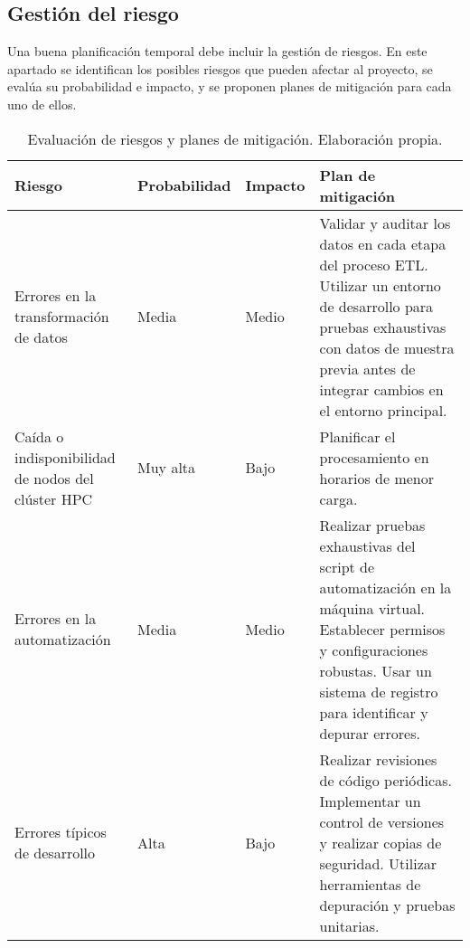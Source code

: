 \subsection{Gestión del riesgo}

Una buena planificación temporal debe incluir la gestión de riesgos. En este apartado se identifican
los posibles riesgos que pueden afectar al proyecto, se evalúa su probabilidad e impacto, y se proponen
planes de mitigación para cada uno de ellos.

\begin{table}[H]
    \centering
    \small %
    \setlength{\tabcolsep}{4pt} %
    \renewcommand{\arraystretch}{1.2} %
    \begin{tabularx}{\textwidth}{|p{2.6cm}|p{2.1cm}|p{1.5cm}|X|}
        \hline
        	\textbf{Riesgo} & \textbf{Probabilidad} & \textbf{Impacto} & \textbf{Plan de mitigación} \\
        \hline
        Errores en la transformación de datos & Media & Medio & Validar y auditar los datos en cada etapa del proceso ETL. Utilizar un entorno de desarrollo para pruebas exhaustivas con datos de muestra previa antes de integrar cambios en el entorno principal. \\
        \hline
        Caída o indisponibilidad de nodos del clúster HPC & Muy alta & Bajo & Planificar el procesamiento en horarios de menor carga. \\
        \hline
        Errores en la automatización & Media & Medio & Realizar pruebas exhaustivas del script de automatización en la máquina virtual. Establecer permisos y configuraciones robustas. Usar un sistema de registro para identificar y depurar errores. \\
        \hline
        Errores típicos de desarrollo & Alta & Bajo & Realizar revisiones de código periódicas. Implementar un control de versiones y realizar copias de seguridad. Utilizar herramientas de depuración y pruebas unitarias. \\
        \hline
    \end{tabularx}
    \caption{Evaluación de riesgos y planes de mitigación. Elaboración propia.}
    \label{tab:riesgos}
\end{table}
